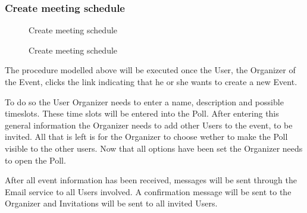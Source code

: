 	\subsubsection{Create meeting schedule}
		\begin{figure}[H]
			\centering
			\begin{msc}{Create meeting schedule}

				\nextlevel
				\nextlevel
				\nextlevel

				\nextlevel
				\nextlevel
				\nextlevel
				\nextlevel
				\nextlevel
				\nextlevel
				\nextlevel

				\nextlevel
				\nextlevel
				\nextlevel

				\nextlevel
				\nextlevel
				\nextlevel

				\nextlevel
				\nextlevel
				\nextlevel
				\nextlevel
				\nextlevel
				\nextlevel
				\nextlevel
			\end{msc}
			\caption{Create meeting schedule}
			\label{msc:createmeeting}
		\end{figure}

		The procedure modelled above will be executed once the User, the Organizer of the Event, clicks the link indicating that he or she wants to create a new Event. 

		To do so the User Organizer needs to enter a name, description and possible timeslots. These time slots will be entered into the Poll. After entering this general information the Organizer needs to add other Users to the event, to be invited. All that is left is for the Organizer to choose wether to make the Poll visible to the other users. Now that all options have been set the Organizer needs to open the Poll.

		After all event information has been received, messages will be sent through the Email service to all Users involved. A confirmation message will be sent to the 	Organizer and Invitations will be sent to all invited Users.

